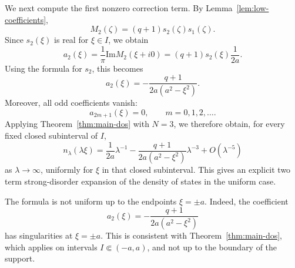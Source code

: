 \documentclass[a4paper,11pt]{article}
\newcommand{\Impart}{\mathrm{Im}}
\begin{document}
We next compute the first nonzero correction term. 
By Lemma~\ref{lem:low-coefficients},
$$
M_2(\zeta)
=
(q+1)s_2(\zeta)s_1(\zeta).
$$
Since $s_2(\xi)$ is real for $\xi\in I$, we obtain
$$
a_2(\xi)
=
\frac{1}{\pi}\Impart M_2(\xi+i0)
=
(q+1)s_2(\xi)\frac{1}{2a}.
$$
Using the formula for $s_2$, this becomes
$$
a_2(\xi)
=
-\frac{q+1}{2a(a^2-\xi^2)}.
$$
Moreover, all odd coefficients vanish:
$$
a_{2m+1}(\xi)=0,
\qquad
m=0,1,2,\ldots .
$$
Applying Theorem~\ref{thm:main-dos} with $N=3$, we therefore obtain,
for every fixed closed subinterval of $I$,
$$
n_\lambda(\lambda\xi)=
\frac{1}{2a}\lambda^{-1}-\frac{q+1}{2a(a^2-\xi^2)}\lambda^{-3}+O(\lambda^{-5})
$$
as $\lambda\to\infty$, uniformly for $\xi$ in that closed subinterval.
This gives an explicit two term strong-disorder expansion of the density
of states in the uniform case.

The formula is not uniform up to the endpoints $\xi=\pm a$.
Indeed, the coefficient
$$
a_2(\xi)
=
-\frac{q+1}{2a(a^2-\xi^2)}
$$
has singularities at $\xi=\pm a$. This is consistent with
Theorem~\ref{thm:main-dos}, which applies on intervals
$I\Subset(-a,a)$, and not up to the boundary of the support.

\end{document}

